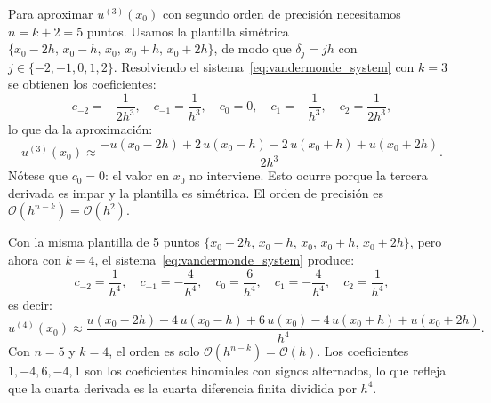 \begin{example}[Tercera derivada centrada --- $k = 3$, $n = 5$]
    Para aproximar $u^{(3)}(x_0)$ con segundo orden de precisión necesitamos $n = k + 2 = 5$ puntos. Usamos la plantilla
    simétrica $\{x_0 - 2h,\, x_0 - h,\, x_0,\, x_0 + h,\, x_0 + 2h\}$, de modo que $\delta_j = jh$ con
    $j \in \{-2, -1, 0, 1, 2\}$. Resolviendo el sistema~\eqref{eq:vandermonde_system} con $k = 3$ se obtienen los
    coeficientes:
    \begin{equation}
        c_{-2} = -\frac{1}{2h^3}, \quad c_{-1} = \frac{1}{h^3}, \quad c_0 = 0, \quad c_1 = -\frac{1}{h^3}, \quad c_2 = \frac{1}{2h^3},
        \label{eq:third_derivative_coeffs}
    \end{equation}
    lo que da la aproximación:
    \begin{equation}
        u^{(3)}(x_0) \approx \frac{-u(x_0 - 2h) + 2\,u(x_0 - h) - 2\,u(x_0 + h) + u(x_0 + 2h)}{2h^3}.
        \label{eq:centered_third_derivative}
    \end{equation}
    Nótese que $c_0 = 0$: el valor en $x_0$ no interviene. Esto ocurre porque la tercera derivada es impar y la
    plantilla es simétrica. El orden de precisión es $\mathcal{O}(h^{n-k}) = \mathcal{O}(h^2)$.
\end{example}

\begin{example}[Cuarta derivada centrada --- $k = 4$, $n = 5$]
    Con la misma plantilla de 5 puntos $\{x_0 - 2h,\, x_0 - h,\, x_0,\, x_0 + h,\, x_0 + 2h\}$, pero ahora con
    $k = 4$, el sistema~\eqref{eq:vandermonde_system} produce:
    \begin{equation}
        c_{-2} = \frac{1}{h^4}, \quad c_{-1} = -\frac{4}{h^4}, \quad c_0 = \frac{6}{h^4}, \quad c_1 = -\frac{4}{h^4}, \quad c_2 = \frac{1}{h^4},
        \label{eq:fourth_derivative_coeffs}
    \end{equation}
    es decir:
    \begin{equation}
        u^{(4)}(x_0) \approx \frac{u(x_0 - 2h) - 4\,u(x_0 - h) + 6\,u(x_0) - 4\,u(x_0 + h) + u(x_0 + 2h)}{h^4}.
        \label{eq:centered_fourth_derivative}
    \end{equation}
    Con $n = 5$ y $k = 4$, el orden es solo $\mathcal{O}(h^{n-k}) = \mathcal{O}(h)$. Los coeficientes $1, -4, 6, -4,
    1$ son los coeficientes binomiales con signos alternados, lo que refleja que la cuarta derivada es la cuarta
    diferencia finita dividida por $h^4$.
\end{example}

